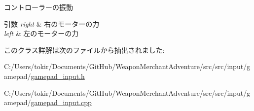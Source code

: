 コントローラーの振動 


\begin{DoxyParams}{引数}
{\em right} & 右のモーターの力 \\
\hline
{\em left} & 左のモーターの力 \\
\hline
\end{DoxyParams}


このクラス詳解は次のファイルから抽出されました\+:\begin{DoxyCompactItemize}
\item 
C\+:/\+Users/tokir/\+Documents/\+Git\+Hub/\+Weapon\+Merchant\+Adventure/src/src/input/gamepad/\mbox{\hyperlink{gamepad__input_8h}{gamepad\+\_\+input.\+h}}\item 
C\+:/\+Users/tokir/\+Documents/\+Git\+Hub/\+Weapon\+Merchant\+Adventure/src/src/input/gamepad/\mbox{\hyperlink{gamepad__input_8cpp}{gamepad\+\_\+input.\+cpp}}\end{DoxyCompactItemize}
